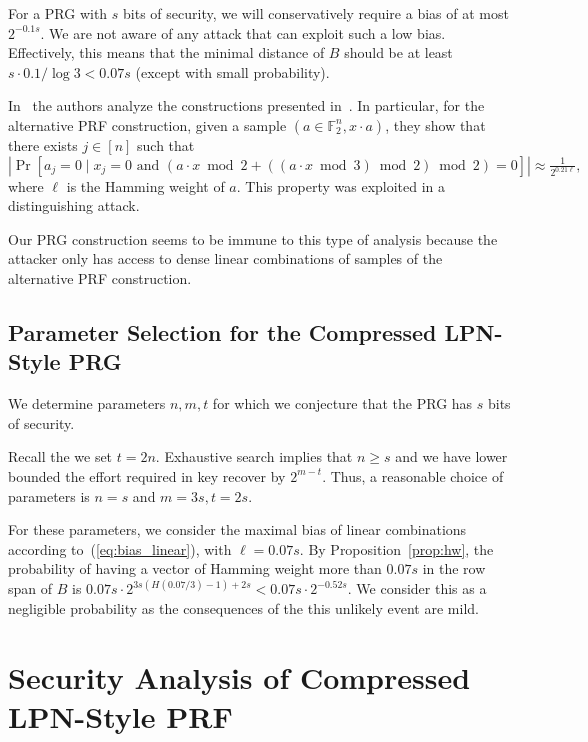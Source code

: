 \documentclass[orivec,envcountsect]{llncs}
\begin{document}
For a PRG with $s$ bits of security, we will conservatively require a bias of at most $2^{-0.1 s}$.
We are not aware of any attack that can exploit such a low bias.
Effectively, this means that the minimal distance of $B$ should be
at least $s \cdot 0.1/\log 3 < 0.07 s$ (except with small probability).


\begin{remark}
In~\cite{CheonCKK20} the authors analyze the constructions presented in~\cite{BonehIPSW18}.
In particular, for the alternative PRF construction,
given a sample $(a \in \mathbb{F}_2^n, x \cdot a)$,
they show that there exists $j \in [n]$ such that
$$|\Pr[a_j = 0 \mid x_j = 0 \text{ and } (a \cdot x \bmod 2 + ((a \cdot x \bmod 3) \bmod 2) \bmod 2) = 0]| \approx \tfrac{1}{2^{0.21 \ell}},$$
where $\ell$ is the Hamming weight of $a$.
This property was exploited in a distinguishing attack.

Our PRG construction seems to be immune to this type of analysis
because the attacker only has access to dense linear combinations of samples
of the alternative PRF construction.
\end{remark}


\subsection{Parameter Selection for the Compressed LPN-Style PRG}

We determine parameters $n,m,t$ for which
we conjecture that the
PRG has $s$ bits of security.

Recall the we set $t = 2n$.
Exhaustive search implies that $n \geq s$ and we have lower
bounded the effort required in key recover by $2^{m - t}$.
Thus, a reasonable choice of parameters is $n = s$ and $m = 3s, t = 2s$.

For these parameters, we consider the maximal bias of linear combinations according to~(\ref{eq:bias_linear}),
with $\ell = 0.07 s$.
By Proposition~\ref{prop:hw},
the probability of having a vector of Hamming weight more than $0.07 s$
in the row span of $B$ is
$0.07 s \cdot 2^{3s (H(0.07/3) - 1) + 2s} < 0.07 s \cdot 2^{-0.52 s}$.
We consider this as a negligible probability
as the consequences of the this unlikely event are mild.


\section{Security Analysis of Compressed LPN-Style PRF}
\end{document}
